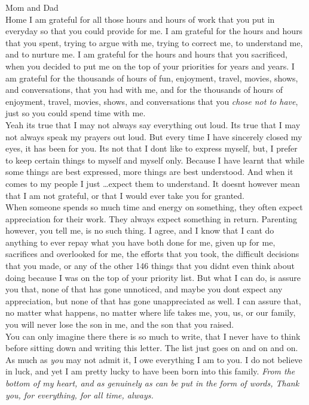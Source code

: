 \documentclass[12pt]{letter}
\begin{document}
\begin{letter}{Mom and Dad \\ Home }
I am grateful for all those hours and hours of work that you put in everyday so that you could provide for me. I am grateful for the hours
and hours that you spent, trying to argue with me, trying to correct me, to understand me, and to nurture me. I am grateful for the hours and hours
that you sacrificed, when you decided to put me on the top of your priorities for years and years. I am grateful for the thousands of hours of fun, 
enjoyment, travel, movies, shows, and conversations, that you had with me, and for the thousands of hours of enjoyment, travel, movies, shows, 
and conversations that you \textit{chose not to have}, just so you could spend time with me. \\


Yeah its true that I may not always say everything out loud. Its true that I may not always speak my prayers out loud. But every time I have
sincerely closed my eyes, it has been for you. Its not that I dont like to express myself, but, I prefer to keep certain things to myself 
and myself only. Because I have learnt that while some things are best expressed, more things are best understood. And when it comes to my people
I just \dots expect them to understand. It doesnt however mean that I am not grateful, or that I would ever take you for granted. \\

When someone spends so much time and energy on something, they often expect appreciation for their work. They always expect something in return. 
Parenting however, you tell me, is no such thing. I agree, and I know that I cant do anything to ever repay what you have both done for me, given up
for me, sacrifices and overlooked for me, the efforts that you took, the difficult decisions that you made, or any of the other 146 things that you didnt
even think about doing because I was on the top of your priority list. But what I can do, is assure you that, none of that has gone unnoticed, 
and maybe you dont expect any appreciation, but none of that has gone unappreciated as well. I can assure that, no matter what happens, no matter 
where life takes me, you, us, or our family, you will never lose the son in me, and the son that you raised.\\   


You can only imagine there there is so much to write, that I never have to think before sitting down and writing this letter. The list just
goes on and on and on. As much as \textit{you} may not admit it, I owe everything I am to you. I do not believe in luck, and yet I am pretty lucky to have
been born into this family. \textit{From the bottom of my heart, and as genuinely as can be put in the form of words, Thank you, for everything, for all time, always.}\\






\end{letter}
\end{document}
